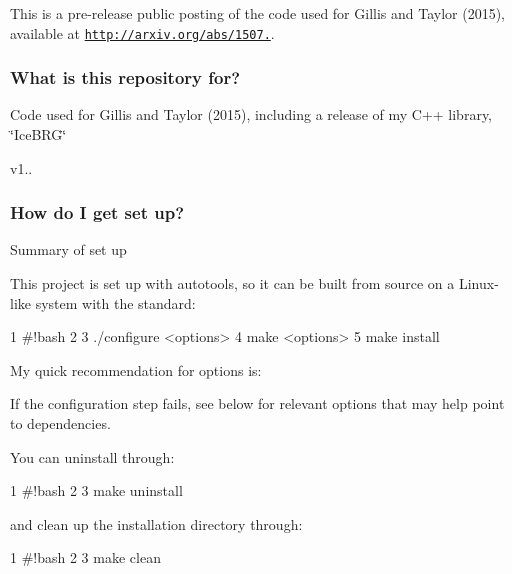 This is a pre-\/release public posting of the code used for Gillis and Taylor (2015), available at \href{http://arxiv.org/abs/1507.01858}{\tt http\+://arxiv.\+org/abs/1507.}.

\subsubsection*{What is this repository for?}


\begin{DoxyItemize}
\item Code used for Gillis and Taylor (2015), including a release of my C++ library, \char`\"{}\+Ice\+B\+R\+G\char`\"{}
\item v1..
\end{DoxyItemize}

\subsubsection*{How do I get set up?}


\begin{DoxyItemize}
\item Summary of set up
\end{DoxyItemize}

This project is set up with autotools, so it can be built from source on a Linux-\/like system with the standard\+:


\begin{DoxyCode}
1 #!bash
2 
3 ./configure <options>
4 make <options>
5 make install
\end{DoxyCode}


My quick recommendation for options is\+:




If the configuration step fails, see below for relevant options that may help point to dependencies.

You can uninstall through\+:


\begin{DoxyCode}
1 #!bash
2 
3 make uninstall
\end{DoxyCode}


and clean up the installation directory through\+:


\begin{DoxyCode}
1 #!bash
2 
3 make clean
\end{DoxyCode}


